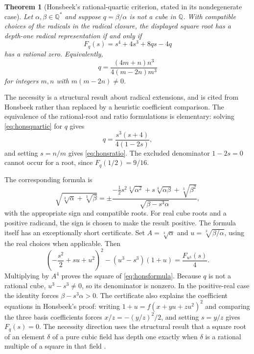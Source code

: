 \documentclass[11pt,oneside]{article}
\numberwithin{equation}{section}
\newtheorem{theorem}{Theorem}[section]
\theoremstyle{definition}
\theoremstyle{remark}
\newcommand{\Q}{\mathbb{Q}}
\begin{document}
\begin{theorem}[Honsbeek's rational-quartic criterion, stated in its nondegenerate case]\label{thm:honsbeek}
Let $\alpha,\beta\in\Q^*$ and suppose $q=\beta/\alpha$ is not a cube in $\Q$. With compatible choices of the radicals in the radical closure, the displayed square root has a depth-one radical representation if and only if
\begin{equation}\label{eq:honsquartic}
F_q(s)=s^4+4s^3+8qs-4q
\end{equation}
has a rational zero. Equivalently,
\begin{equation}\label{eq:honsratio}
q=\frac{(4m+n)n^3}{4(m-2n)m^3}
\end{equation}
for integers $m,n$ with $m(m-2n)\ne0$.
\end{theorem}

The necessity is a structural result about radical extensions, and is cited from Honsbeek rather than replaced by a heuristic coefficient comparison. The equivalence of the rational-root and ratio formulations is elementary: solving \eqref{eq:honsquartic} for $q$ gives
\[
q=\frac{s^3(s+4)}{4(1-2s)},
\]
and setting $s=n/m$ gives \eqref{eq:honsratio}. The excluded denominator $1-2s=0$ cannot occur for a root, since $F_q(1/2)=9/16$.

The corresponding formula is
\begin{equation}\label{eq:honsformula}
\sqrt{\sqrt[3]{\alpha}+\sqrt[3]{\beta}}
=\pm\frac{-\tfrac12s^2\sqrt[3]{\alpha^2}
+s\sqrt[3]{\alpha\beta}+\sqrt[3]{\beta^2}}
{\sqrt{\beta-s^3\alpha}},
\end{equation}
with the appropriate sign and compatible roots. For real cube roots and a positive radicand, the sign is chosen to make the result positive. The formula itself has an exceptionally short certificate. Set $A=\sqrt[3]\alpha$ and $u=\sqrt[3]{\beta/\alpha}$, using the real choices when applicable. Then
\begin{equation}\label{eq:honscertificate}
\left(-\frac{s^2}{2}+su+u^2\right)^2
-(u^3-s^3)(1+u)=\frac{F_{u^3}(s)}4.
\end{equation}
Multiplying by $A^4$ proves the square of \eqref{eq:honsformula}. Because $q$ is not a rational cube, $u^3-s^3\ne0$, so its denominator is nonzero. In the positive-real case the identity forces $\beta-s^3\alpha>0$. The certificate also explains the coefficient equations in Honsbeek's proof: writing $1+u=f(x+yu+zu^2)^2$ and comparing the three basis coefficients forces $x/z=-(y/z)^2/2$, and setting $s=y/z$ gives $F_q(s)=0$. The necessity direction uses the structural result that a square root of an element $\delta$ of a pure cubic field has depth one exactly when $\delta$ is a rational multiple of a square in that field \cite{honsbeek}.
\end{document}
